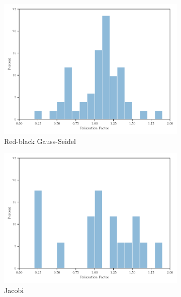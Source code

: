 \begin{figure}
\captionsetup[subfigure]{justification=centering}
	\centering
\begin{subfigure}[b]{0.495\columnwidth}
    \includegraphics[width=\columnwidth]{figures/histogram_rbgs.pdf}
	\caption{Red-black Gauss-Seidel}
	\label{fig:histogram-rbgs}
\end{subfigure}
	\centering
\begin{subfigure}[b]{0.495\columnwidth}
	\centering
    \includegraphics[width=\columnwidth]{figures/histogram_jacobi.pdf}
	\caption{Jacobi}
	\label{fig:histogram-jacobi}
\end{subfigure}
\par\bigskip
	\centering
\begin{subfigure}[b]{0.495\columnwidth}

\end{subfigure}
\end{figure}
